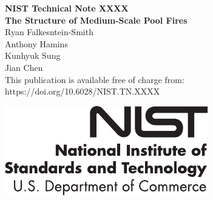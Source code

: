 \documentclass[12pt]{article}
\newcommand{\pubnumber}{XXXX}
\newcommand{\DOI}{https://doi.org/10.6028/NIST.TN.XXXX}
\begin{document}
	
	\begin{titlepage}
		\begin{flushright}
\LARGE{\textbf{NIST Technical Note \pubnumber}}\\
\vfill
\Huge{\textbf{The Structure of Medium-Scale Pool Fires}}\\
\vfill
\large Ryan Falkesntein-Smith\\
\large Anthony Hamins\\
\large Kunhyuk Sung\\
\large Jian Chen\\
\vfill
\normalsize This publication is available free of charge from:\\
\DOI\\
\vfill

\includegraphics[width=0.3\linewidth]{NIST-logo}\\


\end{flushright}
\end{titlepage}
\end{document}
